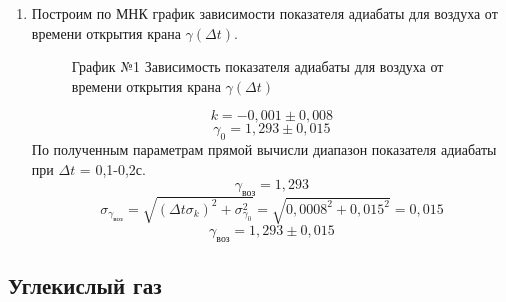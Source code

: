 \documentclass[a4paper]{article}
\begin{document}
\begin{enumerate}
\item Построим по МНК график зависимости показателя адиабаты для воздуха от времени открытия крана $\gamma(\Delta t)$.
\begin{figure}[h!]
\caption[]{\label{} График №1 Зависимость показателя адиабаты для воздуха от времени открытия крана $\gamma(\Delta t)$}
\end{figure}
\begin{equation*}
	k = -0,001 \pm 0,008
\end{equation*}
\begin{equation*}
	\gamma_0 = 1,293 \pm 0,015
\end{equation*}
По полученным параметрам прямой вычисли диапазон показателя адиабаты при $\Delta t$ = 0,1-0,2с.
\begin{equation*}
	\gamma_{\text{воз}} = 1,293
\end{equation*}
\begin{equation*}
	\sigma_{\gamma_{\text{воз}}} = \sqrt{(\Delta t\sigma_k)^2 + \sigma_{\gamma_0}^2} = \sqrt{0,0008^2 + 0,015^2} = 0,015
\end{equation*}
\begin{equation*}
	\gamma_{\text{воз}} = 1,293 \pm 0,015
\end{equation*}
\end{enumerate}


\subsection{Углекислый газ}
\end{document}
